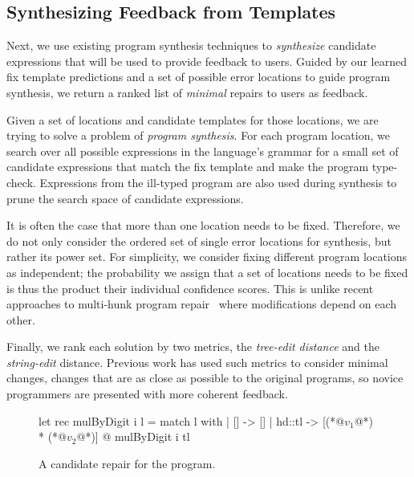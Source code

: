 \subsection{Synthesizing Feedback from Templates}
\label{sec:overview:synthesis}

Next, we use existing program synthesis techniques to \emph{synthesize}
candidate expressions that will be used to provide feedback to users. Guided by
our learned fix template predictions and a set of possible error locations to
guide program synthesis, we return a ranked list of \emph{minimal} repairs to
users as feedback.

 Given a set of locations and candidate templates for
those locations, we are trying to solve a problem of \emph{program synthesis}.
For each program location, we search over all possible
expressions in the language's grammar for a small set of candidate
expressions that match the fix template and make the program type-check.
Expressions from the ill-typed program are also used during synthesis
to prune the search space of candidate expressions.

It is often the case that more than one location needs to be fixed. Therefore,
we do not only consider the ordered set of single error locations for synthesis,
but rather its power set. For simplicity, we consider fixing different program
locations as independent; the probability we assign that a set of locations
needs to be fixed is thus the product their individual confidence scores. This
is unlike recent approaches to multi-hunk program repair~\citep{Saha_2019}
where modifications depend on each other.

 Finally, we rank each solution by two metrics, the
\emph{tree-edit distance} and the \emph{string-edit} distance. Previous work
\citep{Lerner2007-dt, Wang_2018, Gulwani_2018} has used such metrics to consider
minimal changes, \ie changes that are as close as possible to the original
programs, so novice programmers are presented with more coherent feedback.

\begin{figure}[ht]
  \begin{ecode}
  let rec mulByDigit i l =
    match l with
    | []     -> []
    | hd::tl -> [(*@$v_1$@*) * (*@$v_2$@*)] @ mulByDigit i tl
  \end{ecode}
  \caption{A candidate repair for the \mbd program.}
  \label{fig:repair}
  \end{figure}

